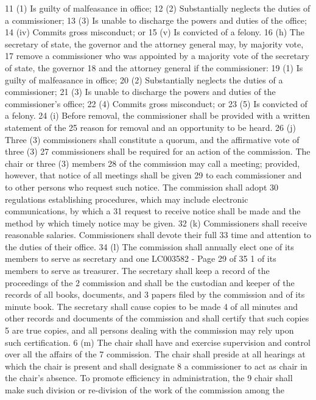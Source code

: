 11 (1) Is guilty of malfeasance in office;
12 (2) Substantially neglects the duties of a commissioner;
13 (3) Is unable to discharge the powers and duties of the office;
14 (iv) Commits gross misconduct; or
15 (v) Is convicted of a felony.
16 (h) The secretary of state, the governor and the attorney general may, by majority vote,
17 remove a commissioner who was appointed by a majority vote of the secretary of state, the governor
18 and the attorney general if the commissioner:
19 (1) Is guilty of malfeasance in office;
20 (2) Substantially neglects the duties of a commissioner;
21 (3) Is unable to discharge the powers and duties of the commissioner’s office;
22 (4) Commits gross misconduct; or
23 (5) Is convicted of a felony.
24 (i) Before removal, the commissioner shall be provided with a written statement of the
25 reason for removal and an opportunity to be heard.
26 (j) Three (3) commissioners shall constitute a quorum, and the affirmative vote of three (3)
27 commissioners shall be required for an action of the commission. The chair or three (3) members
28 of the commission may call a meeting; provided, however, that notice of all meetings shall be given
29 to each commissioner and to other persons who request such notice. The commission shall adopt
30 regulations establishing procedures, which may include electronic communications, by which a
31 request to receive notice shall be made and the method by which timely notice may be given.
32 (k) Commissioners shall receive reasonable salaries. Commissioners shall devote their full
33 time and attention to the duties of their office.
34 (l) The commission shall annually elect one of its members to serve as secretary and one 
LC003582 - Page 29 of 35
1 of its members to serve as treasurer. The secretary shall keep a record of the proceedings of the
2 commission and shall be the custodian and keeper of the records of all books, documents, and
3 papers filed by the commission and of its minute book. The secretary shall cause copies to be made
4 of all minutes and other records and documents of the commission and shall certify that such copies
5 are true copies, and all persons dealing with the commission may rely upon such certification.
6 (m) The chair shall have and exercise supervision and control over all the affairs of the
7 commission. The chair shall preside at all hearings at which the chair is present and shall designate
8 a commissioner to act as chair in the chair's absence. To promote efficiency in administration, the
9 chair shall make such division or re-division of the work of the commission among the
